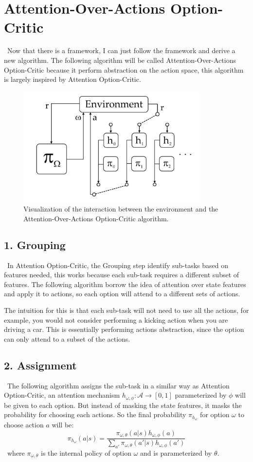 \documentclass{article}
\begin{document}
	\section{Attention-Over-Actions Option-Critic}
	\qquad \ Now that there is a framework, I can just follow the framework and derive a new algorithm. The following algorithm will be called Attention-Over-Actions Option-Critic because it perform abstraction on the action space, this algorithm is largely inspired by Attention Option-Critic.
	\begin{figure}[h]
		\centering
		\includegraphics[width=3.8in]{aoaoc.png}
		\caption{Visualization of the interaction between the environment and the Attention-Over-Actions Option-Critic algorithm.}
	\end{figure}
	\subsection*{1. Grouping}
	\qquad \ In Attention Option-Critic, the Grouping step identify sub-tasks based on features needed, this works because each sub-task requires a different subset of features. The following algorithm borrow the idea of attention over state features and apply it to actions, so each option will attend to a different sets of actions. 
	
	\quad The intuition for this is that each sub-task will not need to use all the actions, for example, you would not consider performing a kicking action when you are driving a car. This is essentially performing actions abstraction, since the option can only attend to a subset of the actions.
	\subsection*{2. Assignment}
	\qquad \ The following algorithm assigns the sub-task in a similar way as Attention Option-Critic, an attention mechanism $h_{\omega,\phi}:\mathcal{A} \rightarrow [0,1]$ parameterized by $\phi$ will be given to each option. But instead of masking the state features, it masks the probability for choosing each actions. So the final probability $\pi_{h_\omega}$ for option $\omega$ to choose action $a$ will be: $$\pi_{h_\omega}(a|s) = \frac{\pi_{\omega,\theta}(a|s)h_{\omega, \phi}(a)}{\sum_{a'} \pi_{\omega,\theta}(a'|s)h_{\omega, \phi}(a')}$$ \qquad \ where $\pi_{\omega,\theta}$ is the internal policy of option $\omega$ and is parameterized by $\theta$.
\end{document}
